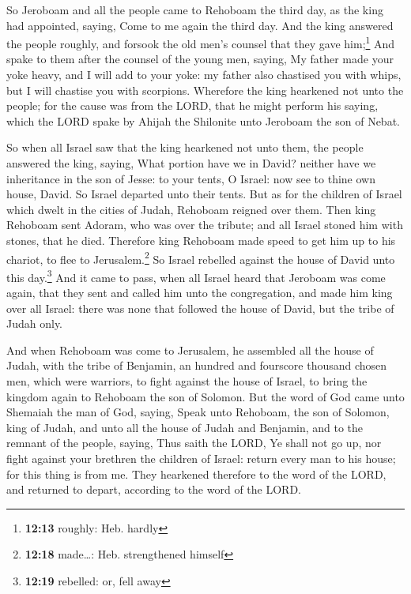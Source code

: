  So Jeroboam and all the people came to Rehoboam the
third day, as the king had appointed, saying, Come to me again the third
day.  And the king answered the people roughly, and
forsook the old men's counsel that they gave him;\footnote{\textbf{12:13}
  roughly: Heb. hardly}  And spake to them after the
counsel of the young men, saying, My father made your yoke heavy, and I
will add to your yoke: my father also chastised you with whips, but I
will chastise you with scorpions.  Wherefore the king
hearkened not unto the people; for the cause was from the LORD, that he
might perform his saying, which the LORD spake by Ahijah the Shilonite
unto Jeroboam the son of Nebat.

 So when all Israel saw that the king hearkened not unto
them, the people answered the king, saying, What portion have we in
David? neither have we inheritance in the son of Jesse: to your tents, O
Israel: now see to thine own house, David. So Israel departed unto their
tents.  But as for the children of Israel which dwelt in
the cities of Judah, Rehoboam reigned over them.  Then
king Rehoboam sent Adoram, who was over the tribute; and all Israel
stoned him with stones, that he died. Therefore king Rehoboam made speed
to get him up to his chariot, to flee to Jerusalem.\footnote{\textbf{12:18}
  made\ldots: Heb. strengthened himself}  So Israel
rebelled against the house of David unto this day.\footnote{\textbf{12:19}
  rebelled: or, fell away}  And it came to pass, when all
Israel heard that Jeroboam was come again, that they sent and called him
unto the congregation, and made him king over all Israel: there was none
that followed the house of David, but the tribe of Judah only.

 And when Rehoboam was come to Jerusalem, he assembled
all the house of Judah, with the tribe of Benjamin, an hundred and
fourscore thousand chosen men, which were warriors, to fight against the
house of Israel, to bring the kingdom again to Rehoboam the son of
Solomon.  But the word of God came unto Shemaiah the man
of God, saying,  Speak unto Rehoboam, the son of Solomon,
king of Judah, and unto all the house of Judah and Benjamin, and to the
remnant of the people, saying,  Thus saith the LORD, Ye
shall not go up, nor fight against your brethren the children of Israel:
return every man to his house; for this thing is from me. They hearkened
therefore to the word of the LORD, and returned to depart, according to
the word of the LORD.

